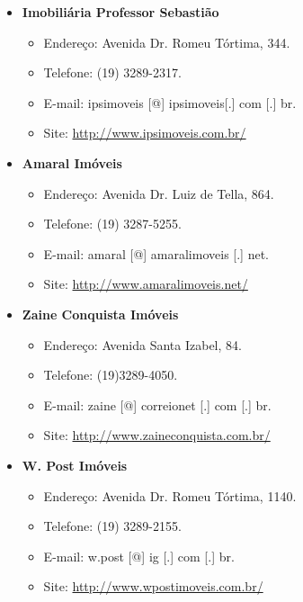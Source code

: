 \begin{itemize}
\item  \textbf{Imobiliária Professor Sebastião}
\begin{itemize}
\item  Endereço: Avenida Dr. Romeu Tórtima, 344.
\item  Telefone: (19) 3289-2317.
\item  E-mail: ipsimoveis [@] ipsimoveis[.] com [.] br.
\item  Site: \url{http://www.ipsimoveis.com.br/}
\end{itemize}
\end{itemize}

\begin{itemize}
\item  \textbf{Amaral Imóveis}
\begin{itemize}
\item  Endereço: Avenida Dr. Luiz de Tella, 864.
\item  Telefone: (19) 3287-5255.
\item  E-mail: amaral [@] amaralimoveis [.] net.
\item  Site: \url{http://www.amaralimoveis.net/}
\end{itemize}
\end{itemize}

\begin{itemize}
\item  \textbf{Zaine Conquista Imóveis}
\begin{itemize}
\item  Endereço: Avenida Santa Izabel, 84.
\item  Telefone: (19)3289-4050.
\item  E-mail: zaine [@] correionet [.] com [.] br.
\item  Site: \url{http://www.zaineconquista.com.br/}
\end{itemize}
\end{itemize}

\begin{itemize}
\item  \textbf{W. Post Imóveis}
\begin{itemize}
\item  Endereço: Avenida Dr. Romeu Tórtima, 1140.
\item  Telefone: (19) 3289-2155.
\item  E-mail: w.post [@] ig [.] com [.] br.
\item  Site: \url{http://www.wpostimoveis.com.br/}
\end{itemize}
\end{itemize}

